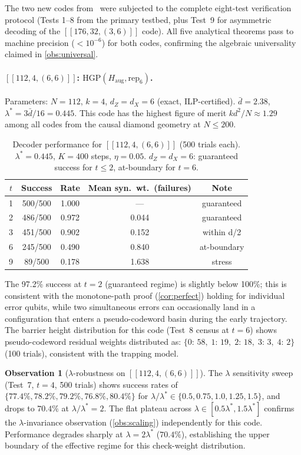 \documentclass[12pt,a4paper]{article}
\theoremstyle{plain}
\theoremstyle{definition}
\newtheorem{observation}[theorem]{Observation}
\theoremstyle{remark}
\begin{document}
The two new codes from~\cite{SchmittScale} were subjected to the complete
eight-test verification protocol (Tests 1--8 from the primary testbed,
plus Test~9 for asymmetric decoding of the $[[176,32,(3,6)]]$ code).
All five analytical theorems pass to machine precision ($<10^{-6}$)
for both codes, confirming the algebraic universality claimed in
\cref{obs:universal}.

\paragraph{$[[112,4,(6,6)]]$: $\mathrm{HGP}(H_{\mathrm{aug}},\mathrm{rep}_6)$.}
Parameters: $N=112$, $k=4$, $d_Z=d_X=6$ (exact, ILP-certified).
$\bar{d}=2.38$, $\lambda^* = 3\bar{d}/16 = 0.445$.
This code has the highest figure of merit $kd^2/N \approx 1.29$ among
all codes from the causal diamond geometry at $N \leq 200$.

\begin{table}[ht]
\centering
\caption{Decoder performance for $[[112,4,(6,6)]]$ (500 trials each).
  $\lambda^* = 0.445$, $K=400$ steps, $\eta=0.05$.
  $d_Z=d_X=6$: guaranteed success for $t\leq 2$, at-boundary for $t=6$.}
\label{tab:112_perf}
\small
\begin{tabular}{ccccc}
\toprule
$t$ & Success & Rate & Mean syn.\ wt.\ (failures) & Note \\
\midrule
1 & 500/500 & 1.000 & --- & guaranteed \\
2 & 486/500 & 0.972 & 0.044 & guaranteed \\
3 & 451/500 & 0.902 & 0.152 & within d/2 \\
6 & 245/500 & 0.490 & 0.840 & at-boundary \\
9 &  89/500 & 0.178 & 1.638 & stress \\
\bottomrule
\end{tabular}
\end{table}

The 97.2\% success at $t=2$ (guaranteed regime) is slightly below
100\%; this is consistent with the monotone-path proof
(\cref{cor:perfect}) holding for individual error qubits, while two
simultaneous errors can occasionally land in a configuration that enters
a pseudo-codeword basin during the early trajectory.
The barrier height distribution for this code (Test~8 census at $t=6$)
shows pseudo-codeword residual weights distributed as:
$\{0{:}\,58,\; 1{:}\,19,\; 2{:}\,18,\; 3{:}\,3,\; 4{:}\,2\}$
(100 trials), consistent with the trapping model.

\begin{observation}[{$\lambda$-robustness on $[[112,4,(6,6)]]$}]
The $\lambda$ sensitivity sweep (Test~7, $t=4$, 500 trials) shows success
rates of $\{77.4\%, 78.2\%, 79.2\%, 76.8\%, 80.4\%\}$ for
$\lambda/\lambda^* \in \{0.5, 0.75, 1.0, 1.25, 1.5\}$, and drops to
$70.4\%$ at $\lambda/\lambda^*=2$.
The flat plateau across $\lambda \in [0.5\lambda^*, 1.5\lambda^*]$ confirms
the $\lambda$-invariance observation (\cref{obs:scaling}) independently
for this code.
Performance degrades sharply at $\lambda = 2\lambda^*$ ($70.4\%$),
establishing the upper boundary of the effective regime for this
check-weight distribution.
\end{observation}
\end{document}
